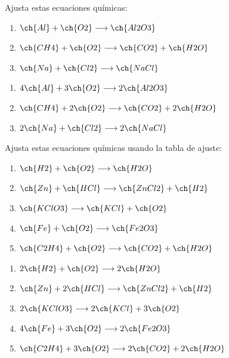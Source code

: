 \begin{exercise}
    Ajusta estas ecuaciones químicas:
    \begin{enumerate}[label=\letraminuscula]
        \item \(\ch{Al} + \ch{O2} \longrightarrow \ch{Al2O3}\)
        \item \(\ch{CH4} + \ch{O2} \longrightarrow \ch{CO2} + \ch{H2O}\)
        \item \(\ch{Na} + \ch{Cl2} \longrightarrow \ch{NaCl}\)
    \end{enumerate}
    \begin{solu}
        \begin{enumerate}[label=\alph*)]
            \item \(4\ch{Al} + 3\ch{O2} \longrightarrow 2\ch{Al2O3}\)
            \item \(\ch{CH4} + 2\ch{O2} \longrightarrow \ch{CO2} + 2\ch{H2O}\)
            \item \(2\ch{Na} + \ch{Cl2} \longrightarrow 2\ch{NaCl}\)
        \end{enumerate}
    \end{solu}
\end{exercise}

\begin{exercise}
    Ajusta estas ecuaciones químicas usando la tabla de ajuste:
    \begin{enumerate}[label=\letraminuscula]
        \item \(\ch{H2} + \ch{O2} \longrightarrow \ch{H2O}\)
        \item \(\ch{Zn} + \ch{HCl} \longrightarrow \ch{ZnCl2} + \ch{H2}\)
        \item \(\ch{KClO3} \longrightarrow \ch{KCl} + \ch{O2}\)
        \item \(\ch{Fe} + \ch{O2} \longrightarrow \ch{Fe2O3}\)
        \item \(\ch{C2H4} + \ch{O2} \longrightarrow \ch{CO2} + \ch{H2O}\)
    \end{enumerate}
    \begin{solu}
        \begin{enumerate}[label=\alph*)]
            \item \(2\ch{H2} + \ch{O2} \longrightarrow 2\ch{H2O}\)
            \item \(\ch{Zn} + 2\ch{HCl} \longrightarrow \ch{ZnCl2} + \ch{H2}\)
            \item \(2\ch{KClO3} \longrightarrow 2\ch{KCl} + 3\ch{O2}\)
            \item \(4\ch{Fe} + 3\ch{O2} \longrightarrow 2\ch{Fe2O3}\)
            \item \(\ch{C2H4} + 3\ch{O2} \longrightarrow 2\ch{CO2} + 2\ch{H2O}\)
        \end{enumerate}
    \end{solu}
\end{exercise}

